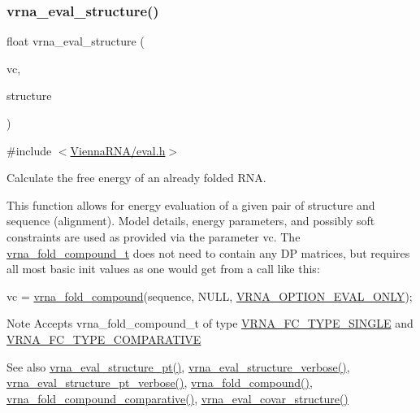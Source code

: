 \subsubsection{\texorpdfstring{vrna\+\_\+eval\+\_\+structure()}{vrna\_eval\_structure()}}
{\footnotesize\ttfamily float vrna\+\_\+eval\+\_\+structure (\begin{DoxyParamCaption}\item[{\hyperlink{group__fold__compound_ga1b0cef17fd40466cef5968eaeeff6166}{vrna\+\_\+fold\+\_\+compound\+\_\+t} $\ast$}]{vc,  }\item[{const char $\ast$}]{structure }\end{DoxyParamCaption})}



{\ttfamily \#include $<$\hyperlink{eval_8h}{Vienna\+R\+N\+A/eval.\+h}$>$}



Calculate the free energy of an already folded R\+NA. 

This function allows for energy evaluation of a given pair of structure and sequence (alignment). Model details, energy parameters, and possibly soft constraints are used as provided via the parameter \textquotesingle{}vc\textquotesingle{}. The \hyperlink{group__fold__compound_ga1b0cef17fd40466cef5968eaeeff6166}{vrna\+\_\+fold\+\_\+compound\+\_\+t} does not need to contain any DP matrices, but requires all most basic init values as one would get from a call like this\+: 
\begin{DoxyCode}
vc = \hyperlink{group__fold__compound_ga6601d994ba32b11511b36f68b08403be}{vrna\_fold\_compound}(sequence, NULL, \hyperlink{group__fold__compound_ga61469c423131552c8483229f8b6c7e0e}{VRNA\_OPTION\_EVAL\_ONLY});
\end{DoxyCode}


\begin{DoxyNote}{Note}
Accepts vrna\+\_\+fold\+\_\+compound\+\_\+t of type \hyperlink{group__fold__compound_gga01a4ff86fa71deaaa5d1abbd95a1447da7e264dd3cf2dc9b6448caabcb7763cd6}{V\+R\+N\+A\+\_\+\+F\+C\+\_\+\+T\+Y\+P\+E\+\_\+\+S\+I\+N\+G\+LE} and \hyperlink{group__fold__compound_gga01a4ff86fa71deaaa5d1abbd95a1447dab821ce46ea3cf665be97df22a76f5023}{V\+R\+N\+A\+\_\+\+F\+C\+\_\+\+T\+Y\+P\+E\+\_\+\+C\+O\+M\+P\+A\+R\+A\+T\+I\+VE}
\end{DoxyNote}
\begin{DoxySeeAlso}{See also}
\hyperlink{group__eval_gadbd09372ddfd7a450bbd590c96a6bfe4}{vrna\+\_\+eval\+\_\+structure\+\_\+pt()}, \hyperlink{group__eval_ga0928d699d310178f84ee2351034e5cb5}{vrna\+\_\+eval\+\_\+structure\+\_\+verbose()}, \hyperlink{group__eval_ga8a517cfeeae8c376ae7b1e0c401d38b4}{vrna\+\_\+eval\+\_\+structure\+\_\+pt\+\_\+verbose()}, \hyperlink{group__fold__compound_ga6601d994ba32b11511b36f68b08403be}{vrna\+\_\+fold\+\_\+compound()}, \hyperlink{group__fold__compound_gad6bacc816af274922b13d947f708aa0c}{vrna\+\_\+fold\+\_\+compound\+\_\+comparative()}, \hyperlink{group__eval_ga6cea75c0eb9857fb59172be54cab09e0}{vrna\+\_\+eval\+\_\+covar\+\_\+structure()}
\end{DoxySeeAlso}

